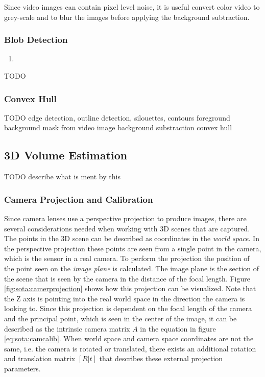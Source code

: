 Since video images can contain pixel level noise, it is useful convert color video to grey-scale and to blur the images before applying the background subtraction.

\subsubsection{Blob Detection}

\begin{enumerate}
    \item 
\end{enumerate}

TODO

\subsubsection{Convex Hull}

TODO
edge detection, outline detection, silouettes, contours
foreground background mask from video image
background substraction
convex hull


\subsection{3D Volume Estimation}

TODO describe what is ment by this

\subsubsection{Camera Projection and Calibration}

Since camera lenses use a perspective projection to produce images, 
there are several considerations needed when working with \ac{3D} scenes that are captured.
The points in the 3D scene can be described as coordinates in the \emph{world space}.
In the perspective projection these points are seen from a single point in the camera, 
which is the sensor in a real camera.
To perform the projection the position of the point seen on the \emph{image plane} is calculated.
The image plane is the section of the scene that is seen by the camera in the distance of the focal length.
Figure \ref{fig:sota:camerprojection} shows how this projection can be visualized.
Note that the Z axis is pointing into the real world space in the direction the camera is looking to.
Since this projection is dependent on the focal length of the camera and the principal point, which is seen in the center of the image, it can be described as the intrinsic camera matrix $ A $ in the equation in figure \ref{eq:sota:camcalib}.
When world space and camera space coordinates are not the same, i.e. the camera is rotated or translated, there exists an additional rotation and translation matrix $ [R|t] $ that describes these external projection parameters.

